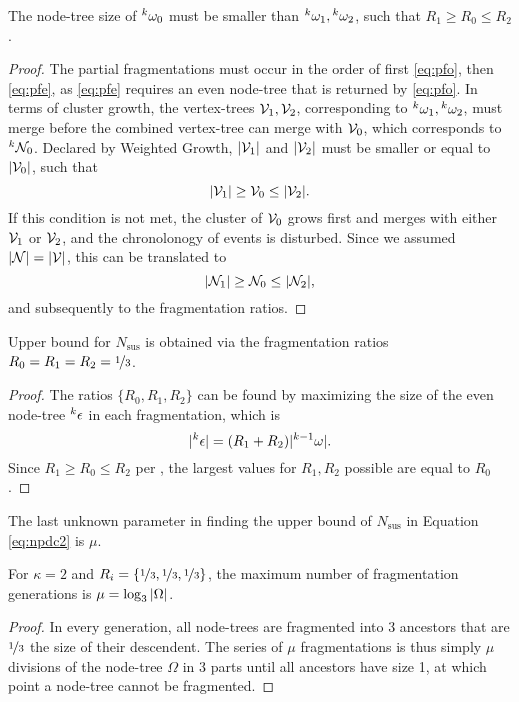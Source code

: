 \begin{lemma}\label{lem:chrono}
  The node-tree size of ${}^{k}\omega_0$ must be smaller than ${}^{k}\omega_1, {}^{k}\omega_2$, such that $R_1 \geq R_0 \leq R_2$. 
\end{lemma}
\begin{proof}
  The partial fragmentations must occur in the order of first \eqref{eq:pfo}, then \eqref{eq:pfe}, as \eqref{eq:pfe} requires an even node-tree that is returned by \eqref{eq:pfo}. In terms of cluster growth, the vertex-trees $\mathcal{V}_1, \mathcal{V}_2$, corresponding to ${}^{k}\omega_1, {}^{k}\omega_2$, must merge before the combined vertex-tree can merge with $\mathcal{V}_0$, which corresponds to ${}^{k}\mathcal{N}_0$. Declared by Weighted Growth, $\lvert\mathcal{V}_1\rvert$ and $\lvert\mathcal{V}_2\rvert$ must be smaller or equal to $\lvert\mathcal{V}_0\rvert$, such that 
  \begin{equation*}
    \lvert\mathcal{V}_1\rvert\geq \mathcal{V}_0 \leq\lvert\mathcal{V}_2\rvert.
  \end{equation*}
  If this condition is not met, the cluster of $\mathcal{V}_0$ grows first and merges with either $\mathcal{V}_1$ or $\mathcal{V}_2$, and the chronolonogy of events is disturbed. Since we assumed $\lvert\mathcal{N}\rvert=\lvert\mathcal{V}\rvert$, this can be translated to 
  \begin{equation*}
    \lvert\mathcal{N}_1\rvert\geq \mathcal{N}_0 \leq\lvert\mathcal{N}_2\rvert,
  \end{equation*}
  and subsequently to the fragmentation ratios.
\end{proof}

\begin{theorem}\label{the:ratios}
  Upper bound for $N_{\text{sus}}$ is obtained via the fragmentation ratios $R_0 = R_1 = R_2 = \nicefrac{1}{3}$.
\end{theorem}
\begin{proof}
  The ratios $\{R_0, R_1, R_2\}$ can be found by maximizing the size of the even node-tree ${}^{k}\epsilon$ in each fragmentation, which is 
  \begin{equation*}
    \lvert{}^{k}\epsilon\rvert = (R_1 + R_2)\lvert{}^{k-1}\omega\rvert.
  \end{equation*}
  Since $ R_1 \geq R_0 \leq R_2$ per , the largest values for $R_1, R_2$ possible are equal to $R_0$.
\end{proof}

The last unknown parameter in finding the upper bound of $N_{\text{sus}}$ in Equation \eqref{eq:npdc2} is $\mu$.

\begin{theorem}\label{the:km}
  For $\kappa = 2$ and $R_i = \{\nicefrac{1}{3},\nicefrac{1}{3},\nicefrac{1}{3}\}$, the maximum number of fragmentation generations is $\mu = \log_3{\lvert\Omega\rvert}$.
\end{theorem}
\begin{proof}
  In every generation, all node-trees are fragmented into 3 ancestors that are $\nicefrac{1}{3}$ the size of their descendent. The series of $\mu$ fragmentations is thus simply $\mu$ divisions of the node-tree $\Omega$ in 3 parts until all ancestors have size 1, at which point a node-tree cannot be fragmented.
\end{proof}

